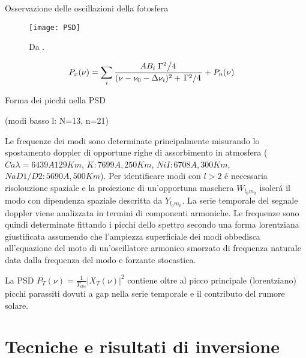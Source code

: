 \documentclass[10pt,xcolor={usenames},fleqn,mathserif,serif]{beamer}
\begin{document}
\begin{frame}{Osservazione delle oscillazioni della fotosfera}

\begin{figure}[!ht]


\texttt{[image: PSD]}
\caption{Da \cite{houdek2006stochastic}.}\label{fig:PSD}

\end{figure}

\begin{align*}
&P_x(\nu)=\sum_i\frac{AB_i\left.{\Gamma^2}\middle/{4}\right.}{(\nu-\nu_0-\Delta\nu_i)^2+\left.{\Gamma^2}\middle/{4}\right.}+P_n(\nu)
\end{align*}

\end{frame}

\begin{wordonframe}{Forma dei picchi nella PSD}

(modi basso l: N=13, n=21)

Le frequenze dei modi sono determinate principalmente misurando lo spostamento doppler di opportune righe di assorbimento in atmosfera ($Ca \lambda=6439 A 129 Km$, $K: 7699 A, 250Km$, $Ni I: 6708 A,300 Km$, $Na D1/D2: 5690 A, 500 Km$). Per identificare modi con $l>2$ \'e necessaria risolouzione spaziale e la proiezione di un'opportuna maschera $W_{l_0m_0}$ isoler\'a il modo con dipendenza spaziale descritta da $Y_{l_0m_0}$. La serie temporale del segnale doppler viene analizzata in termini di componenti armoniche. Le frequenze sono quindi determinate fittando i picchi dello spettro secondo una forma lorentziana  giustificata assumendo che l'ampiezza superficiale dei modi obbedisca all'equazione del moto di un'oscillatore armonico smorzato di frequenza naturale data dalla frequenza del modo e forzante stocastica.

La PSD $P_T(\nu)=\frac{1}{T_{obs}}|X_T(\nu)|^2$ contiene oltre al picco principale (lorentziano) picchi parassiti dovuti a gap nella serie temporale e il contributo del rumore solare.

\end{wordonframe}


\part{Tecniche e risultati di inversione}\label{part:inverseproblem}
\end{document}
